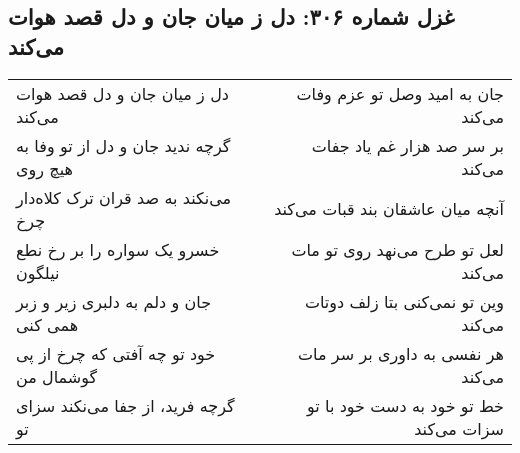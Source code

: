 \begin{center}
\section*{غزل شماره ۳۰۶: دل ز میان جان و دل قصد هوات می‌کند}
\label{sec:306}
\begin{longtable}{l p{0.5cm} r}
دل ز میان جان و دل قصد هوات می‌کند
&&
جان به امید وصل تو عزم وفات می‌کند
\\
گرچه ندید جان و دل از تو وفا به هیچ روی
&&
بر سر صد هزار غم یاد جفات می‌کند
\\
می‌نکند به صد قران ترک کلاه‌دار چرخ
&&
آنچه میان عاشقان بند قبات می‌کند
\\
خسرو یک سواره را بر رخ نطع نیلگون
&&
لعل تو طرح می‌نهد روی تو مات می‌کند
\\
جان و دلم به دلبری زیر و زبر همی کنی
&&
وین تو نمی‌کنی بتا زلف دوتات می‌کند
\\
خود تو چه آفتی که چرخ از پی گوشمال من
&&
هر نفسی به داوری بر سر مات می‌کند
\\
گرچه فرید، از جفا می‌نکند سزای تو
&&
خط تو خود به دست خود با تو سزات می‌کند
\\
\end{longtable}
\end{center}
